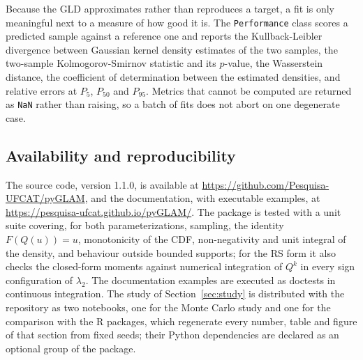 Because the GLD approximates rather than reproduces a target, a fit is only
meaningful next to a measure of how good it is. The \texttt{Performance} class
scores a predicted sample against a reference one and reports the
Kullback-Leibler divergence between Gaussian kernel density estimates of the
two samples, the two-sample Kolmogorov-Smirnov statistic and its $p$-value, the
Wasserstein distance, the coefficient of determination between the estimated
densities, and relative errors at $P_5$, $P_{50}$ and $P_{95}$. Metrics that
cannot be computed are returned as \texttt{NaN} rather than raising, so a batch
of fits does not abort on one degenerate case.

\subsection{Availability and reproducibility}

The source code, version 1.1.0, is available at
\url{https://github.com/Pesquisa-UFCAT/pyGLAM}, and the documentation, with
executable examples, at \url{https://pesquisa-ufcat.github.io/pyGLAM/}. The
package is tested with a unit suite covering, for both parameterizations,
sampling, the identity $F(Q(u)) = u$, monotonicity of the CDF, non-negativity
and unit integral of the density, and behaviour outside bounded supports; for
the RS form it also checks the closed-form moments against numerical
integration of $Q^k$ in every sign configuration of $\lambda_2$. The
documentation examples are executed as doctests in continuous integration. The
study of Section~\ref{sec:study} is distributed with the repository as two
notebooks, one for the Monte Carlo study and one for the comparison with the R
packages, which regenerate every number, table and figure of that section from
fixed seeds; their Python dependencies are declared as an optional group of the
package.
